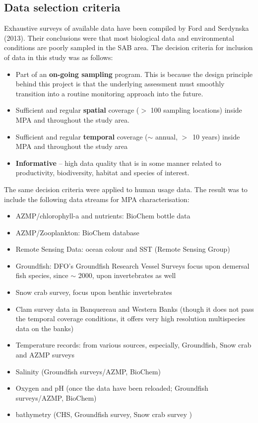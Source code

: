\documentclass[letterpaper,portrait,11pt]{scrartcl}
\numberwithin{equation}{section}		%
\numberwithin{figure}{section}		%
\numberwithin{table}{section}				%
\begin{document}
\subsection{Data selection criteria}
Exhaustive surveys of available data have been compiled by Ford and Serdynska (2013). Their conclusions were that most biological data and environmental conditions are poorly sampled in the SAB area. The decision criteria for inclusion of data in this study was as follows:

\begin{itemize}
	\item Part of an \textbf{on-going sampling} program. This is because the design principle behind this project is that the underlying assessment must smoothly transition into a routine monitoring approach into the future.
  \item	Sufficient and regular \textbf{spatial} coverage ($>$ 100 sampling locations) inside MPA and throughout the study area.
  \item Sufficient and regular \textbf{temporal} coverage ($\sim$ annual, $>$~10 years) inside MPA and throughout the study area
  \item \textbf{Informative} -- high data quality that is in some manner related to productivity, biodiversity, habitat and species of interest.
\end{itemize}

The same decision criteria were applied to human usage data. The result was to include the following data streams for MPA characterisation:

\begin{itemize}
	\item AZMP/chlorophyll-a and nutrients: BioChem bottle data  \parencite{DFO:2014:biochem}
  \item AZMP/Zooplankton: BioChem database \parencite{DFO:2014:biochem}
  \item Remote Sensing Data: ocean colour and SST (Remote Sensing Group)
  \item Groundfish: DFO's Groundfish Research Vessel Surveys focus upon demersal fish species, since $\sim$ 2000, upon invertebrates as well
  \item Snow crab survey, focus upon benthic invertebrates
  \item Clam survey data in Banquereau and Western Banks (though it does not pass the temporal coverage conditions, it offers very high resolution multispecies data on the banks)
  \item Temperature records: from various sources, especially, Groundfish, Snow crab and AZMP surveys
  \item Salinity (Groundfish surveys/AZMP, BioChem)
  \item Oxygen and pH (once the data have been reloaded; Groundfish surveys/AZMP, BioChem)
  \item bathymetry (CHS, Groundfish survey, Snow crab survey )
\end{itemize}
\end{document}
